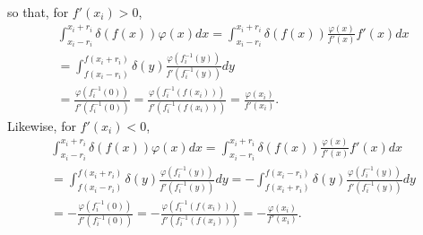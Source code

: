 { so that, for  $f'(x_i)>0$,
\begin{equation}
\begin{split}
\int_{x_i-r_i}^{x_i+r_i} \delta (f(x)) \varphi(x) dx
=
\int_{x_i-r_i}^{x_i+r_i} \delta (f(x)) \frac{\varphi(x)}{f'(x)} f'(x)  dx   \\
=
\int_{f(x_i-r_i)}^{f(x_i+r_i)} \delta (y) \frac{\varphi(f_i^{-1} (y))}{f'(f_i^{-1} (y))}   dy  \\
=  \frac{\varphi(f_i^{-1} (0))}{f'(f_i^{-1} (0))}
=  \frac{\varphi(f_i^{-1} (f(x_i)))}{f'(f_i^{-1} (f(x_i)))}
=  \frac{\varphi( x_i)}{f'( x_i )}.
\end{split}
\end{equation}
Likewise, for  $f'(x_i)<0$,
\begin{equation}
\begin{split}
\int_{x_i-r_i}^{x_i+r_i} \delta (f(x)) \varphi(x) dx
=
\int_{x_i-r_i}^{x_i+r_i} \delta (f(x)) \frac{\varphi(x)}{f'(x)} f'(x)  dx   \\
=
\int_{f(x_i-r_i)}^{f(x_i+r_i)} \delta (y) \frac{\varphi(f_i^{-1} (y))}{f'(f_i^{-1} (y))}   dy
=
- \int_{f(x_i+r_i)}^{f(x_i-r_i)} \delta (y) \frac{\varphi(f_i^{-1} (y))}{f'(f_i^{-1} (y))}   dy  \\
=  - \frac{\varphi(f_i^{-1} (0))}{f'(f_i^{-1} (0))}
=  - \frac{\varphi(f_i^{-1} (f(x_i)))}{f'(f_i^{-1} (f(x_i)))}
=  - \frac{\varphi( x_i)}{f'( x_i )} .
\end{split}
\end{equation}
\eproof
}


